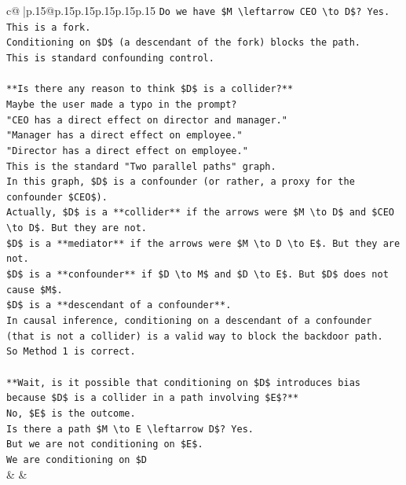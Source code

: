 \documentclass{article}
\begin{document}
{\begin{supertabular}{c@{$\;$}|p{.15\linewidth}@{}p{.15\linewidth}p{.15\linewidth}p{.15\linewidth}p{.15\linewidth}p{.15\linewidth}}
{{{\texttt{Do we have \$M \textbackslash{}leftarrow CEO \textbackslash{}to D\$? Yes.} \\
\texttt{This is a fork.} \\
\texttt{Conditioning on \$D\$ (a descendant of the fork) blocks the path.} \\
\texttt{This is standard confounding control.} \\
\\ 
\texttt{**Is there any reason to think \$D\$ is a collider?**} \\
\texttt{Maybe the user made a typo in the prompt?} \\
\texttt{"CEO has a direct effect on director and manager."} \\
\texttt{"Manager has a direct effect on employee."} \\
\texttt{"Director has a direct effect on employee."} \\
\texttt{This is the standard "Two parallel paths" graph.} \\
\texttt{In this graph, \$D\$ is a confounder (or rather, a proxy for the confounder \$CEO\$).} \\
\texttt{Actually, \$D\$ is a **collider** if the arrows were \$M \textbackslash{}to D\$ and \$CEO \textbackslash{}to D\$. But they are not.} \\
\texttt{\$D\$ is a **mediator** if the arrows were \$M \textbackslash{}to D \textbackslash{}to E\$. But they are not.} \\
\texttt{\$D\$ is a **confounder** if \$D \textbackslash{}to M\$ and \$D \textbackslash{}to E\$. But \$D\$ does not cause \$M\$.} \\
\texttt{\$D\$ is a **descendant of a confounder**.} \\
\texttt{In causal inference, conditioning on a descendant of a confounder (that is not a collider) is a valid way to block the backdoor path.} \\
\texttt{So Method 1 is correct.} \\
\\ 
\texttt{**Wait, is it possible that conditioning on \$D\$ introduces bias because \$D\$ is a collider in a path involving \$E\$?**} \\
\texttt{No, \$E\$ is the outcome.} \\
\texttt{Is there a path \$M \textbackslash{}to E \textbackslash{}leftarrow D\$? Yes.} \\
\texttt{But we are not conditioning on \$E\$.} \\
\texttt{We are conditioning on \$D} \\
            }
        }
    }
    & & \\ \\


\end{supertabular}}
\end{document}
